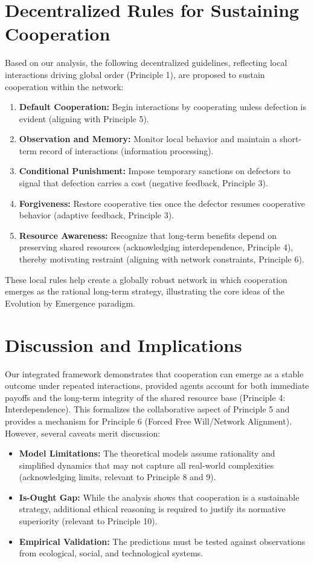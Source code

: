 \section{Decentralized Rules for Sustaining Cooperation}
Based on our analysis, the following decentralized guidelines, reflecting local interactions driving global order (Principle 1), are proposed to sustain cooperation within the network:
\begin{enumerate}
    \item \textbf{Default Cooperation:} Begin interactions by cooperating unless defection is evident (aligning with Principle 5).
    \item \textbf{Observation and Memory:} Monitor local behavior and maintain a short-term record of interactions (information processing).
    \item \textbf{Conditional Punishment:} Impose temporary sanctions on defectors to signal that defection carries a cost (negative feedback, Principle 3).
    \item \textbf{Forgiveness:} Restore cooperative ties once the defector resumes cooperative behavior (adaptive feedback, Principle 3).
    \item \textbf{Resource Awareness:} Recognize that long-term benefits depend on preserving shared resources (acknowledging interdependence, Principle 4), thereby motivating restraint (aligning with network constraints, Principle 6).
\end{enumerate}
These local rules help create a globally robust network in which cooperation emerges as the rational long-term strategy, illustrating the core ideas of the Evolution by Emergence paradigm. %

\section{Discussion and Implications}
Our integrated framework demonstrates that cooperation can emerge as a stable outcome under repeated interactions, provided agents account for both immediate payoffs and the long-term integrity of the shared resource base (Principle 4: Interdependence). This formalizes the collaborative aspect of Principle 5 and provides a mechanism for Principle 6 (Forced Free Will/Network Alignment). However, several caveats merit discussion:
\begin{itemize}
    \item \textbf{Model Limitations:} The theoretical models assume rationality and simplified dynamics that may not capture all real-world complexities (acknowledging limits, relevant to Principle 8 and 9).
    \item \textbf{Is-Ought Gap:} While the analysis shows that cooperation is a sustainable strategy, additional ethical reasoning is required to justify its normative superiority (relevant to Principle 10).
    \item \textbf{Empirical Validation:} The predictions must be tested against observations from ecological, social, and technological systems.
\end{itemize} %

